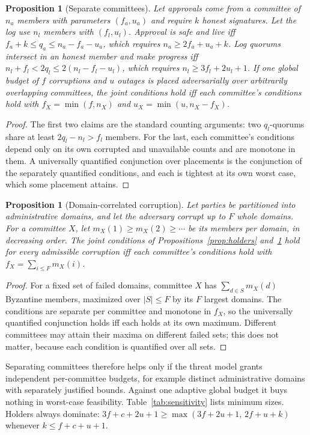 \documentclass[pdflatex,sn-mathphys-num]{sn-jnl}
\theoremstyle{plain}
\newtheorem{proposition}[theorem]{Proposition}
\theoremstyle{definition}
\begin{document}
\begin{proposition}[Separate committees]\label{prop:committees}
Let approvals come from a committee of $n_a$ members with parameters $(f_a,u_a)$ and require $k$ honest signatures. Let the log use $n_l$ members with $(f_l,u_l)$. Approval is safe and live iff $f_a+k\le q_a\le n_a-f_a-u_a$, which requires $n_a\ge2f_a+u_a+k$. Log quorums intersect in an honest member and make progress iff $n_l+f_l<2q_l\le2(n_l-f_l-u_l)$, which requires $n_l\ge3f_l+2u_l+1$. If one global budget of $f$ corruptions and $u$ outages is placed adversarially over arbitrarily overlapping committees, the joint conditions hold iff each committee's conditions hold with $f_X=\min(f,n_X)$ and $u_X=\min(u,n_X-f_X)$.
\end{proposition}
\begin{proof}
The first two claims are the standard counting arguments: two $q_l$-quorums share at least $2q_l-n_l>f_l$ members. For the last, each committee's conditions depend only on its own corrupted and unavailable counts and are monotone in them. A universally quantified conjunction over placements is the conjunction of the separately quantified conditions, and each is tightest at its own worst case, which some placement attains.
\end{proof}

\begin{proposition}[Domain-correlated corruption]\label{prop:domains}
Let parties be partitioned into administrative domains, and let the adversary corrupt up to $F$ whole domains. For a committee $X$, let $m_X(1)\ge m_X(2)\ge\cdots$ be its members per domain, in decreasing order. The joint conditions of Propositions~\ref{prop:holders} and~\ref{prop:committees} hold for every admissible corruption iff each committee's conditions hold with $f_X=\sum_{i\le F}m_X(i)$.
\end{proposition}
\begin{proof}
For a fixed set of failed domains, committee $X$ has $\sum_{d\in S}m_X(d)$ Byzantine members, maximized over $|S|\le F$ by its $F$ largest domains. The conditions are separate per committee and monotone in $f_X$, so the universally quantified conjunction holds iff each holds at its own maximum. Different committees may attain their maxima on different failed sets; this does not matter, because each condition is quantified over all sets.
\end{proof}

Separating committees therefore helps only if the threat model grants independent per-committee budgets, for example distinct administrative domains with separately justified bounds. Against one adaptive global budget it buys nothing in worst-case feasibility. Table~\ref{tab:sensitivity} lists minimum sizes. Holders always dominate: $3f+c+2u+1\ge\max(3f+2u+1,\,2f+u+k)$ whenever $k\le f+c+u+1$.
\end{document}
